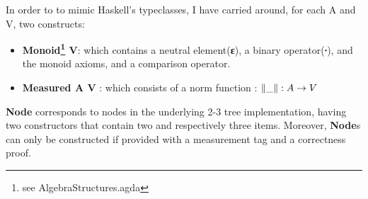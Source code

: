 \documentclass[12pt,twoside,notitlepage]{report}
\begin{document}
In order to to mimic Haskell's typeclasses, I have carried around, for each A and V, two constructs:

\begin{itemize} 
\item \textbf{Monoid\footnote{see AlgebraStructures.agda} V}: which contains a neutral element(\textbf{ε}), a binary operator(\textbf{∙}), and the monoid axioms, and a comparison operator.
\item \textbf{Measured A V} : which consists of a norm function  :  \textbf{$\Vert\_\Vert : \nolinebreak A \rightarrow V$}
\end{itemize} 


\textbf{Node} corresponds to nodes in the underlying 2-3 tree implementation, having two constructors that contain two and respectively three items. Moreover, \textbf{Node}s can only be constructed if provided with a measurement tag and a correctness proof.
  
\end{document}
